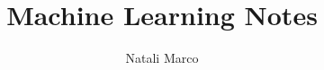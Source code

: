 \documentclass[11pt]{book}
\begin{document}
    \title{Machine Learning Notes}
    \author{Natali Marco}
    \date{}

    \maketitle
    \tableofcontents
    \listoffigures

\end{document}
